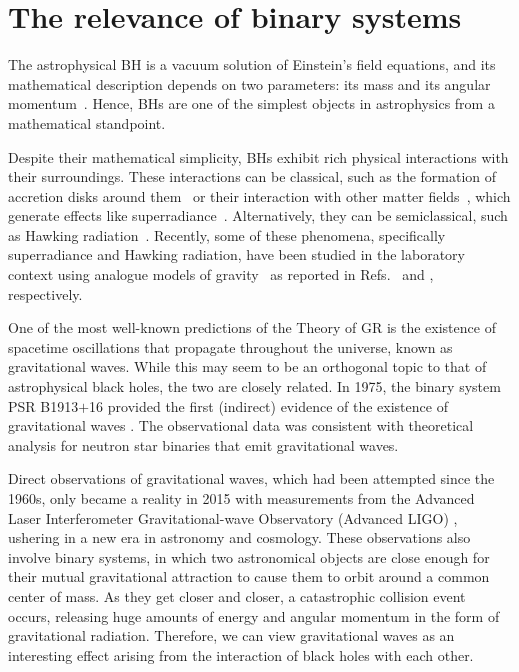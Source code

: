 \section{The relevance of binary systems}

The astrophysical \ac{BH} is a vacuum solution of Einstein's field equations, and its mathematical description depends on two parameters: its mass and its angular momentum~\cite{1986bhmp.book.....T}. Hence, \acp{BH} are one of the simplest objects in astrophysics from a mathematical standpoint.

Despite their mathematical simplicity, \acp{BH} exhibit rich physical interactions with their surroundings. These interactions can be classical, such as the formation of accretion disks around them~\cite{Abramowicz2013} or their interaction with other matter fields~\cite{Ficarra2023}, which generate effects like superradiance~\cite{PhysRevD.87.043513}. Alternatively, they can be semiclassical, such as Hawking radiation~\cite{Wald2001}. Recently, some of these phenomena, specifically superradiance and Hawking radiation, have been studied in the laboratory context using analogue models of gravity~\cite{Barcel2011} as reported in Refs.~\cite{Torres2017} and \cite{Kolobov2021}, respectively.

One of the most well-known predictions of the Theory of \ac{GR} is the existence of spacetime oscillations that propagate throughout the universe, known as gravitational waves. While this may seem to be an orthogonal topic to that of astrophysical black holes, the two are closely related. In 1975, the binary system PSR B1913$+$16 provided the first (indirect) evidence of the existence of gravitational waves \cite{1975ApJ...195L..51H}. The observational data was consistent with theoretical analysis for neutron star binaries that emit gravitational waves.

Direct observations of gravitational waves, which had been attempted since the 1960s, only became a reality in 2015 with measurements from the Advanced Laser Interferometer Gravitational-wave Observatory (Advanced LIGO) \cite{grav1,grav2}, ushering in a new era in astronomy and cosmology. These observations also involve binary systems, in which two astronomical objects are close enough for their mutual gravitational attraction to cause them to orbit around a common center of mass. As they get closer and closer, a catastrophic collision event occurs, releasing huge amounts of energy and angular momentum in the form of gravitational radiation. Therefore, we can view gravitational waves as an interesting effect arising from the interaction of black holes with each other.

